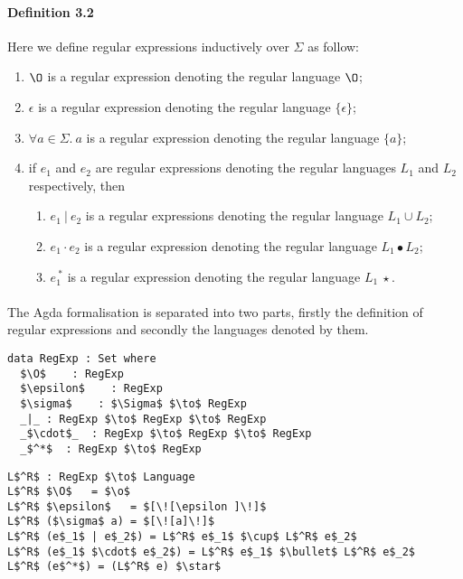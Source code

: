 \paragraph{Definition 3.2} Here we define regular expressions
inductively over \(\Sigma\) as follow: 
\begin{enumerate}[nolistsep]
  \item \(\O\) is a regular expression denoting the regular language \(\O\);
  \item \(\epsilon\) is a regular expression denoting the regular language \(\{\epsilon\}\);
  \item \(\forall a\in\Sigma.\ a\) is a regular expression denoting the regular language \(\{a\}\);
  \item if \(e_{1}\) and \(e_{2}\) are regular expressions denoting the regular
    languages \(L_1\) and \(L_2\) respectively, then
    \begin{enumerate}[nolistsep]
      \item \(e_{1}\ |\ e_{2}\) is a regular expressions denoting the
        regular language \(L_1 \cup L_2\);
      \item \(e_{1}\cdot e_{2}\) is a regular expression denoting the
        regular language \(L_1\bullet L_2\);
      \item \(e_{1}^{\ *}\) is a regular expression denoting the regular
        language \(L_1\ \star\).
     \end{enumerate}
\end{enumerate}
\paragraph{} The Agda formalisation is separated into two parts, firstly the
definition of regular expressions and secondly the languages denoted by
them.

\begin{lstlisting}[caption=Regular expressions,mathescape=true]
data RegExp : Set where
  $\O$    : RegExp
  $\epsilon$    : RegExp
  $\sigma$    : $\Sigma$ $\to$ RegExp
  _|_ : RegExp $\to$ RegExp $\to$ RegExp
  _$\cdot$_  : RegExp $\to$ RegExp $\to$ RegExp
  _$^*$  : RegExp $\to$ RegExp
\end{lstlisting} 

\begin{lstlisting}[caption=Languages denoted by regular expressions,mathescape=true]
L$^R$ : RegExp $\to$ Language
L$^R$ $\O$   = $\o$
L$^R$ $\epsilon$   = $[\![\epsilon ]\!]$
L$^R$ ($\sigma$ a) = $[\![a]\!]$
L$^R$ (e$_1$ | e$_2$) = L$^R$ e$_1$ $\cup$ L$^R$ e$_2$
L$^R$ (e$_1$ $\cdot$ e$_2$) = L$^R$ e$_1$ $\bullet$ L$^R$ e$_2$
L$^R$ (e$^*$) = (L$^R$ e) $\star$
\end{lstlisting}

